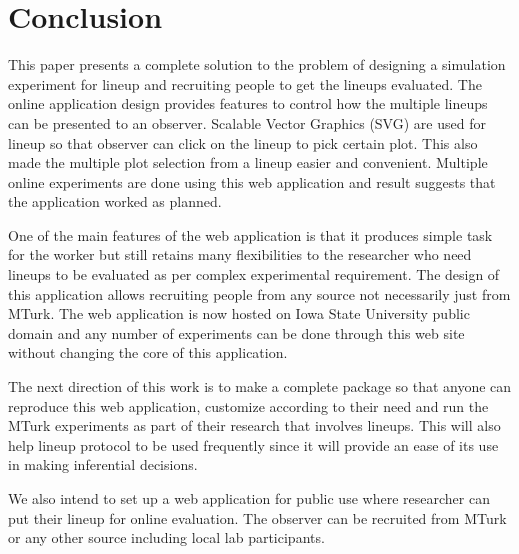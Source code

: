 \documentclass[11pt]{article}
\begin{document}


\section{Conclusion} This paper presents a complete solution to the problem of designing a simulation experiment for lineup and recruiting people to get the lineups evaluated. The online application design provides features to control how the multiple lineups can be presented to an observer. Scalable Vector Graphics (SVG) are used for lineup so that observer can click on the lineup to pick certain plot. This also made the multiple plot selection from a lineup easier and convenient. Multiple online experiments are done using this web application and result suggests that the application worked as planned.

One of the main features of the web application is that it produces simple task for the worker but still retains many flexibilities to the researcher who need lineups to be evaluated as per complex experimental requirement. The design of this application allows recruiting people from any source not necessarily just from MTurk. The web application is now hosted on Iowa State University public domain \citep{majumder:turk} and any number of experiments can be done through this web site without changing the core of this application.

The next direction of this work is to make a complete package so that anyone can reproduce this web application, customize according to their need and run the MTurk experiments as part of their research that involves lineups. This will also help lineup protocol to be used frequently since it will provide an ease of its use in making inferential decisions.

We also intend to set up a web application for public use where researcher can put their lineup for online evaluation. The observer can be recruited from MTurk or any other source including local lab participants. 
\end{document}
